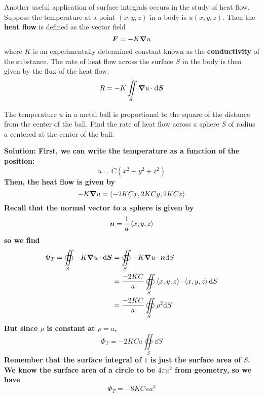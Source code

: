 Another useful application of surface integrals occurs in the study of heat flow. Suppose the temperature at a point $(x,y,z)$ in a body is $u(x,y,z)$. Then the \textbf{heat flow} is defined as the vector field
\[ \boldsymbol{F} = -K\grad u\]
where $K$ is an experimentally determined constant known as the \textbf{conductivity} of the substance. The rate of heat flow across the surface $S$ in the body is then given by the flux of the heat flow.
\[ R = -K\iint\limits_S\grad u \cdot \dd \boldsymbol{S} \]
\begin{example}
    The temperature $u$ in a metal ball is proportional to the square of the distance from the center of the ball. Find the rate of heat flow across a sphere $S$ of radius $a$ centered at the center of the ball. \par
    \bf{Solution:} First, we can write the temperature as a function of the position:
    \[ u = C(x^2+y^2+z^2)\]
    Then, the heat flow is given by
    \[ -K \grad u = \left\langle -2KCx, 2KCy, 2KCz \right\rangle \]
    Recall that the normal vector to a sphere is given by
    \[ \boldsymbol{n} = \frac{1}{a} \left\langle x,y,z\right\rangle\]
    so we find
    \begin{align*}
        \Phi_T = \oiint\limits_S -K\grad u \cdot \dd \boldsymbol{S} &= \oiint\limits_S -K\grad u \cdot \boldsymbol{n} \dd S \\
        &= \frac{-2KC}{a}\oiint\limits_S \left\langle x,y,z\right\rangle \cdot \left\langle x,y,z\right\rangle \dd S \\
        &= \frac{-2KC}{a}\oiint\limits_S \rho^2\dd S
    \end{align*}
    But since $\rho$ is constant at $\rho=a$,
    \[ \Phi_T = -2KCa\oiint\limits_S \dd S\]
    Remember that the surface integral of $1$ is just the surface area of $S$. We know the surface area of a circle to be $4\pi a^2$ from geometry, so we have
    \[ \Phi_T = -8KC\pi a^3\]
\end{example}
